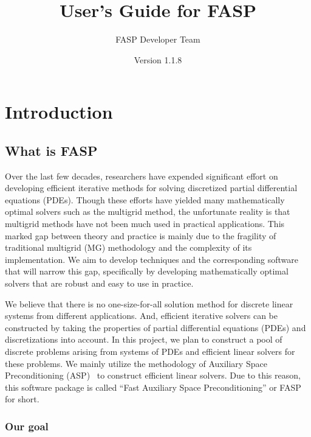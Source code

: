 \documentclass[11pt]{memoir}
\title{User's Guide for FASP}
\author{FASP Developer Team}
\date{Version 1.1.8} %
\begin{document}
\maketitle

\newpage
\tableofcontents

\chapter{Introduction}\label{ch:intro}

\section{What is FASP}\label{sec:goal}

Over the last few decades, researchers have expended significant effort on developing efficient iterative methods for solving discretized partial differential equations (PDEs). Though these efforts have yielded many mathematically optimal solvers such as the multigrid method, the unfortunate reality is that multigrid methods have not been much used in practical applications. This marked gap between theory and practice is mainly due to the fragility of traditional multigrid (MG) methodology and the complexity of its implementation. We aim to develop techniques and the corresponding software that will narrow this gap, specifically by developing mathematically optimal solvers that are robust and easy to use in practice.

We believe that there is no one-size-for-all solution method for discrete linear systems from different applications. And, efficient iterative solvers can be constructed by taking the properties of partial differential equations (PDEs) and discretizations into account. In this project, we plan to construct a pool of discrete problems arising from systems of PDEs and efficient linear solvers for these problems. We mainly utilize the methodology of Auxiliary Space Preconditioning (ASP)~\cite{Xu.Xu.2010ff} to construct efficient linear solvers. Due to this reason, this software package is called ``Fast Auxiliary Space Preconditioning'' or FASP for short.

\subsection{Our goal}
\end{document}
